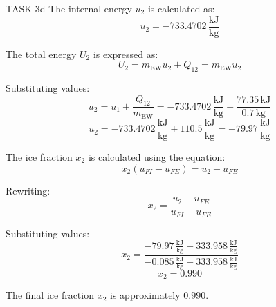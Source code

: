 TASK 3d  
The internal energy \( u_2 \) is calculated as:  
\[
u_2 = -733.4702 \, \frac{\text{kJ}}{\text{kg}}
\]  

The total energy \( U_2 \) is expressed as:  
\[
U_2 = m_{\text{EW}} u_2 + Q_{12} = m_{\text{EW}} u_2
\]  

Substituting values:  
\[
u_2 = u_1 + \frac{Q_{12}}{m_{\text{EW}}} = -733.4702 \, \frac{\text{kJ}}{\text{kg}} + \frac{77.35 \, \text{kJ}}{0.7 \, \text{kg}}
\]  
\[
u_2 = -733.4702 \, \frac{\text{kJ}}{\text{kg}} + 110.5 \, \frac{\text{kJ}}{\text{kg}} = -79.97 \, \frac{\text{kJ}}{\text{kg}}
\]  

The ice fraction \( x_2 \) is calculated using the equation:  
\[
x_2 (u_{FI} - u_{FE}) = u_2 - u_{FE}
\]  

Rewriting:  
\[
x_2 = \frac{u_2 - u_{FE}}{u_{FI} - u_{FE}}
\]  

Substituting values:  
\[
x_2 = \frac{-79.97 \, \frac{\text{kJ}}{\text{kg}} + 333.958 \, \frac{\text{kJ}}{\text{kg}}}{-0.085 \, \frac{\text{kJ}}{\text{kg}} + 333.958 \, \frac{\text{kJ}}{\text{kg}}}
\]  
\[
x_2 = 0.990
\]  

The final ice fraction \( x_2 \) is approximately \( 0.990 \).